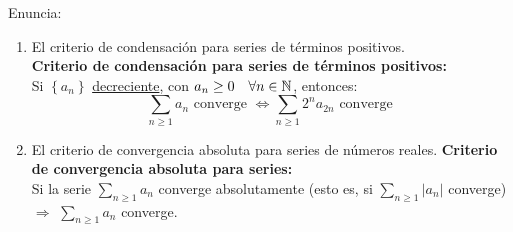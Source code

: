 \documentclass[12pt]{article}
\begin{document}
	\begin{ejercicio}[1 punto] Enuncia:
		\begin{enumerate}
			\item El criterio de condensación para series de términos positivos. \\
			\textbf{Criterio de condensación para series de términos positivos:} \\
			Si $\left\{a_n\right\}$ \underline{decreciente}, con $a_n \geq 0 \quad \forall n \in {\mathbb{N}}$, entonces:
			$$ \sum\limits_{n\geq 1}a_n \text{ converge }\iff \sum\limits_{n\geq 1}2^na_{2n} \text{ converge }$$
			
			\item El criterio de convergencia absoluta para series de números reales.
			\textbf{Criterio de convergencia absoluta para series:} \\
			Si la serie $\sum\limits_{n\geq 1}a_n$ converge absolutamente (esto es, si $\sum\limits_{n\geq 1}\left|a_n\right|$ converge) $\Rightarrow$ $\sum\limits_{n\geq 1}a_n$ converge.
		\end{enumerate}
	\end{ejercicio}
	
\end{document}
